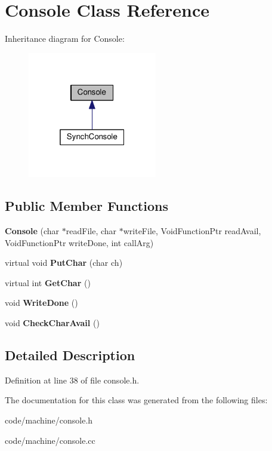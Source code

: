 \section{Console Class Reference}
\label{class_console}


Inheritance diagram for Console\+:\nopagebreak
\begin{figure}[H]
\begin{center}
\leavevmode
\includegraphics[width=160pt]{class_console__inherit__graph}
\end{center}
\end{figure}
\subsection*{Public Member Functions}
\begin{DoxyCompactItemize}
\item 
{\bfseries Console} (char $\ast$read\+File, char $\ast$write\+File, Void\+Function\+Ptr read\+Avail, Void\+Function\+Ptr write\+Done, int call\+Arg)\label{class_console_a406c2b2b53d474272656d7ec934b7235}

\item 
virtual void {\bfseries Put\+Char} (char ch)\label{class_console_af4828702d63f7f144e8d17395471b59f}

\item 
virtual int {\bfseries Get\+Char} ()\label{class_console_a871a3f4742f6481b903a360179d8f4a7}

\item 
void {\bfseries Write\+Done} ()\label{class_console_a8a611e74235a39a9b7216b6d66e32c30}

\item 
void {\bfseries Check\+Char\+Avail} ()\label{class_console_a099797597b7bd0b349518aac215fcb2f}

\end{DoxyCompactItemize}


\subsection{Detailed Description}


Definition at line 38 of file console.\+h.



The documentation for this class was generated from the following files\+:\begin{DoxyCompactItemize}
\item 
code/machine/console.\+h\item 
code/machine/console.\+cc\end{DoxyCompactItemize}
